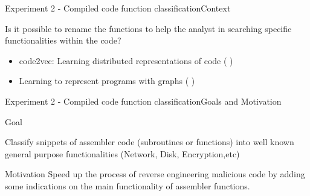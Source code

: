 \documentclass[xcolor=table]{beamer}
\begin{document}
\begin{frame}{Experiment 2 - Compiled code function classification}{Context}


Is it possible to rename the functions to help the analyst in searching specific functionalities within the code?


\begin{itemize}
    \item code2vec: Learning distributed representations of code (\citep{code2vec} )
    \item Learning to represent programs with graphs (\citep{139} )
\end{itemize}


% 
% 






\end{frame}




\begin{frame}{Experiment 2 - Compiled code function classification}{Goals and Motivation}

\begin{block}{Goal}{
       
        Classify snippets of assembler code (subroutines or functions) into well known general purpose functionalities (Network, Disk, Encryption,etc)

    }\end{block}
    \begin{block}{Motivation}{
        Speed up the process of reverse engineering malicious code by adding some indications on the main functionality of assembler functions.
    }\end{block}
\end{frame}
\end{document}
